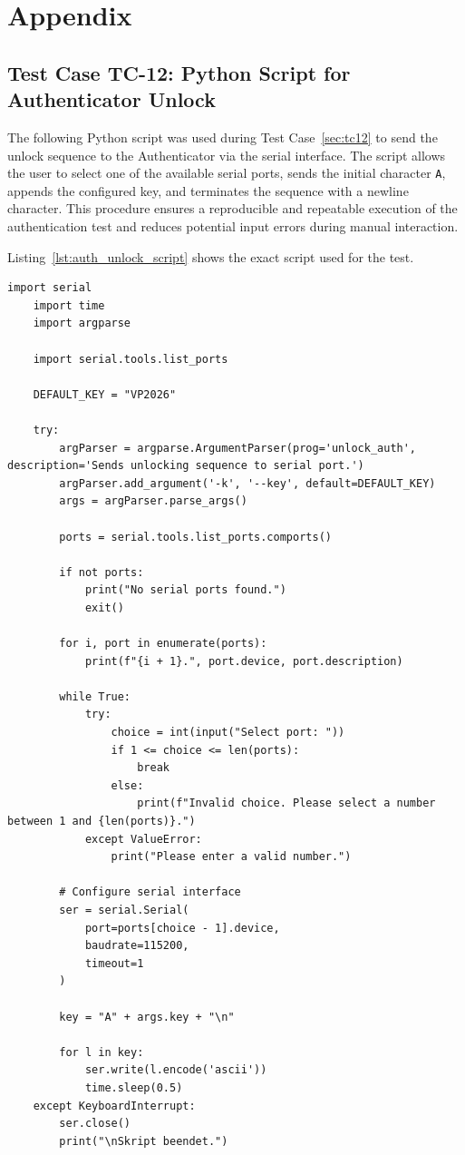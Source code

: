 \chapter{Appendix}
\label{app:appendix}

\section{Test Case TC-12: Python Script for Authenticator Unlock}
\label{app:auth_script_section}

The following Python script was used during Test Case~\ref{sec:tc12} to send the unlock sequence to the Authenticator via the serial interface. The script allows the user to select one of the available serial ports, sends the initial character \texttt{A}, appends the configured key, and terminates the sequence with a newline character. This procedure ensures a reproducible and repeatable execution of the authentication test and reduces potential input errors during manual interaction.

Listing~\ref{lst:auth_unlock_script} shows the exact script used for the test.

\begin{lstlisting}[style=python, caption={Python script used to unlock the Authenticator during TC-10}, label={lst:auth_unlock_script}]
    import serial
    import time
    import argparse

    import serial.tools.list_ports

    DEFAULT_KEY = "VP2026"

    try:
        argParser = argparse.ArgumentParser(prog='unlock_auth', description='Sends unlocking sequence to serial port.')
        argParser.add_argument('-k', '--key', default=DEFAULT_KEY)
        args = argParser.parse_args()

        ports = serial.tools.list_ports.comports()

        if not ports:
            print("No serial ports found.")
            exit()

        for i, port in enumerate(ports):
            print(f"{i + 1}.", port.device, port.description)

        while True:
            try:
                choice = int(input("Select port: "))
                if 1 <= choice <= len(ports):
                    break
                else:
                    print(f"Invalid choice. Please select a number between 1 and {len(ports)}.")
            except ValueError:
                print("Please enter a valid number.")

        # Configure serial interface
        ser = serial.Serial(
            port=ports[choice - 1].device,
            baudrate=115200,
            timeout=1
        )

        key = "A" + args.key + "\n"

        for l in key:
            ser.write(l.encode('ascii'))
            time.sleep(0.5)
    except KeyboardInterrupt:
        ser.close()
        print("\nSkript beendet.")
\end{lstlisting}

